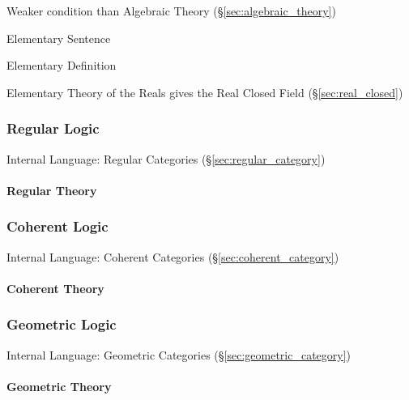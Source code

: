 Weaker condition than Algebraic Theory (\S\ref{sec:algebraic_theory})

Elementary Sentence

Elementary Definition

Elementary Theory of the Reals gives the Real Closed Field
(\S\ref{sec:real_closed})



\subsubsection{Regular Logic}\label{sec:regular_logic}

Internal Language: Regular Categories (\S\ref{sec:regular_category})



\paragraph{Regular Theory}\label{sec:regular_theory}



\subsubsection{Coherent Logic}\label{sec:coherent_logic}

Internal Language: Coherent Categories (\S\ref{sec:coherent_category})



\paragraph{Coherent Theory}\label{sec:coherent_theory}



\subsubsection{Geometric Logic}\label{sec:geometric_logic}

Internal Language: Geometric Categories (\S\ref{sec:geometric_category})



\paragraph{Geometric Theory}\label{sec:geometric_theory}




